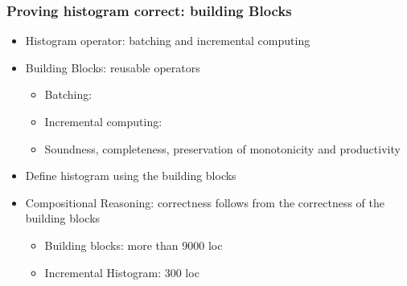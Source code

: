 \documentclass[aspectratio=169,10pt]{beamer}
\begin{document}
\begin{frame}[fragile]
  \frametitle{Proving histogram correct: building Blocks}
  \begin{itemize}
    \item Histogram operator: batching and incremental computing
    \item Building Blocks: reusable operators
          \begin{itemize}
            \item Batching: 
            \item Incremental computing: 
            \item Soundness, completeness, preservation of monotonicity and productivity
          \end{itemize}
          \item Define histogram using the building blocks
          \item Compositional Reasoning: correctness follows from the correctness of the building blocks
          \begin{itemize}
            \item Building blocks: more than 9000 loc
            \item Incremental Histogram: 300 loc
          \end{itemize}
  \end{itemize}
\end{frame}

\end{document}
